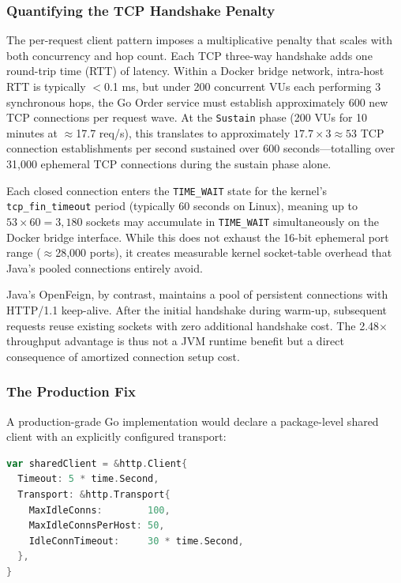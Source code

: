\documentclass[conference]{IEEEtran}
\begin{document}
\subsubsection{Quantifying the TCP Handshake Penalty}

The per-request client pattern imposes a multiplicative penalty that scales with both concurrency and hop count. Each TCP three-way handshake adds one round-trip time (RTT) of latency. Within a Docker bridge network, intra-host RTT is typically $<$0.1 ms, but under 200 concurrent VUs each performing 3 synchronous hops, the Go Order service must establish approximately 600 new TCP connections per request wave. At the \texttt{Sustain} phase (200 VUs for 10 minutes at $\approx$17.7 req/s), this translates to approximately $17.7 \times 3 \approx 53$ TCP connection establishments per second sustained over 600 seconds---totalling over 31,000 ephemeral TCP connections during the sustain phase alone.

Each closed connection enters the \texttt{TIME\_WAIT} state for the kernel's \texttt{tcp\_fin\_timeout} period (typically 60 seconds on Linux), meaning up to $53 \times 60 = 3{,}180$ sockets may accumulate in \texttt{TIME\_WAIT} simultaneously on the Docker bridge interface. While this does not exhaust the 16-bit ephemeral port range ($\approx$28,000 ports), it creates measurable kernel socket-table overhead that Java's pooled connections entirely avoid.

Java's OpenFeign, by contrast, maintains a pool of persistent connections with HTTP/1.1 keep-alive. After the initial handshake during warm-up, subsequent requests reuse existing sockets with zero additional handshake cost. The 2.48$\times$ throughput advantage is thus not a JVM runtime benefit but a direct consequence of amortized connection setup cost.

\subsubsection{The Production Fix}

A production-grade Go implementation would declare a package-level shared client with an explicitly configured transport:

\begin{lstlisting}[language=Go, caption={Production-grade Go HTTP client with connection pooling}, label={lst:gofix}]
var sharedClient = &http.Client{
  Timeout: 5 * time.Second,
  Transport: &http.Transport{
    MaxIdleConns:        100,
    MaxIdleConnsPerHost: 50,
    IdleConnTimeout:     30 * time.Second,
  },
}
\end{lstlisting}
\end{document}
